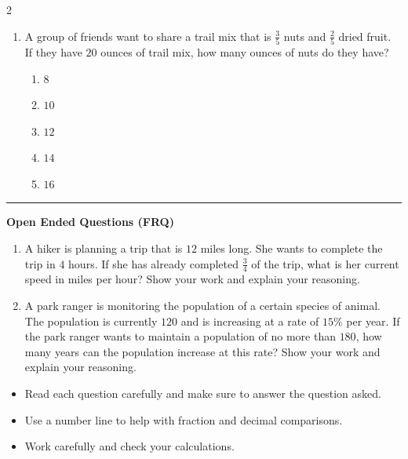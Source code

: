 \documentclass[10pt]{article}
\begin{document}
\begin{multicols}{2}
\begin{enumerate}[label=\textbf{Q\arabic*.}, leftmargin=*, itemsep=6pt, parsep=0pt]
  \item \small A group of friends want to share a trail mix that is $\frac{3}{5}$ nuts and $\frac{2}{5}$ dried fruit. If they have $20$ ounces of trail mix, how many ounces of nuts do they have?
  \begin{enumerate}[label=(\Alph*), leftmargin=0.6cm, nosep, itemsep=2pt]
    \item $8$
    \item $10$
    \item $12$
    \item $14$
    \item $16$
  \end{enumerate}

\end{enumerate}
\end{multicols}

\vspace{-0.2cm}
\hrule
\vspace{0.2cm}
\textbf{\small Open Ended Questions (FRQ)}
\begin{enumerate}[label=\textbf{Q\arabic*.}, start=9, itemsep=5pt, topsep=0pt]

  \item \small A hiker is planning a trip that is $12$ miles long. She wants to complete the trip in $4$ hours. If she has already completed $\frac{3}{4}$ of the trip, what is her current speed in miles per hour? Show your work and explain your reasoning. \vspace{2cm}

  \item \small A park ranger is monitoring the population of a certain species of animal. The population is currently $120$ and is increasing at a rate of $15\%$ per year. If the park ranger wants to maintain a population of no more than $180$, how many years can the population increase at this rate? Show your work and explain your reasoning. \vspace{2cm}

\end{enumerate}

\vfill

\begin{tcolorbox}[colback=blue!5, colframe=mainblue!50, title=\small \textbf{Chef's Tips}, fonttitle=\bfseries, bottom=1mm]
\begin{itemize}[noitemsep, topsep=2pt, leftmargin=0.5cm]
  \item \scriptsize Read each question carefully and make sure to answer the question asked.\item \scriptsize Use a number line to help with fraction and decimal comparisons.\item \scriptsize Work carefully and check your calculations.
\end{itemize}
\end{tcolorbox}
\end{document}
